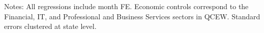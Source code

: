 \documentclass{article}
\begin{document}
\begin{table} \centering
	\scalebox{.74}
	{}
	\begin{minipage}{.95\textwidth} \scriptsize
		\vspace{2mm}
		Notes: All regressions include month FE.
		Economic controls correspond to the Financial, IT, and Professional 
		and Business Services sectors in QCEW. Standard errors clustered at 
		state level.
	\end{minipage}
\end{table}
\end{document}
